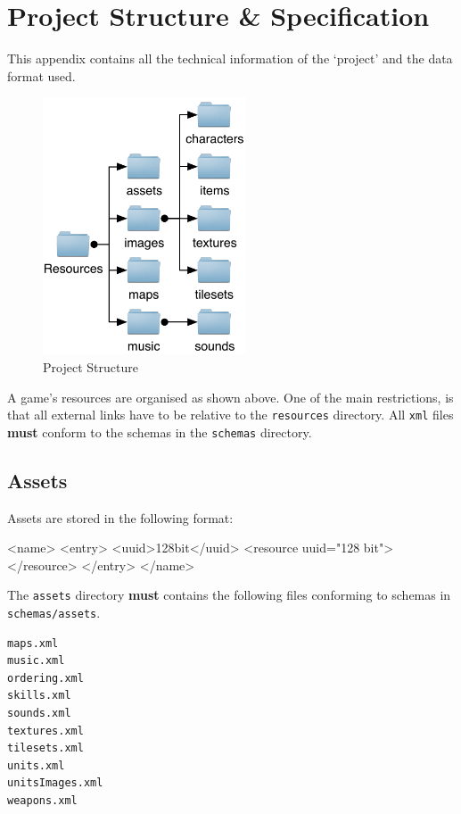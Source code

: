 \section{Project Structure \& Specification}
\label{sec:project_structure___specification}

This appendix contains all the technical information of the `project' and the data format used.

\begin{figure}[htbp]
	\centering
		\includegraphics[height=3in]{figures/Files.pdf}
	\caption{Project Structure}
	\label{fig:figures_Files}
\end{figure}

A game's resources  are organised as shown above. One of the main restrictions, is that all external links have to be relative to the \texttt{resources} directory. All \texttt{xml} files \textbf{must} conform to the schemas in the \texttt{schemas} directory. 


\subsection{Assets}
Assets are stored in the following format:
\begin{lst:resource}[caption=Assets format]
<name>
  <entry>
    <uuid>128bit</uuid> 
    <resource uuid="128 bit">
    </resource>
  </entry>
</name>
\end{lst:resource}

The \texttt{assets} directory \textbf{must} contains the following files conforming to schemas in \texttt{schemas/assets}.
\begin{lstlisting}[caption=Required Assets]
maps.xml
music.xml
ordering.xml
skills.xml
sounds.xml
textures.xml
tilesets.xml
units.xml
unitsImages.xml
weapons.xml
\end{lstlisting}

